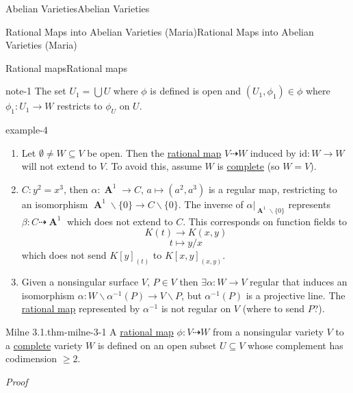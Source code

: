 \documentclass[10pt,]{book}
\makeatletter
\renewcommand*{\proofname}{Proof}
\renewenvironment{proof}[1][\proofname]{\par
  \pushQED{\qed}%
  \normalfont \topsep6\p@\@plus6\p@\relax
  \trivlist
  \item\relax
    {\itshape
    #1\@addpunct{.}}\hspace\labelsep\ignorespaces
}{%
  \popQED\endtrivlist\@endpefalse
}
\numberwithin{equation}{section}
\newcommand{\id}{\mathrm{id}}
\DeclareMathOperator{\aff}{\mathbf{A}}
\makeatother
\begin{document}
\begin{chapterptx}{Abelian Varieties}{}{Abelian Varieties}{}{}
\begin{sectionptx}{Rational Maps into Abelian Varieties (Maria)}{}{Rational Maps into Abelian Varieties (Maria)}{}{}
\begin{subsectionptx}{Rational maps}{}{Rational maps}{}{}
\begin{note}{}{note-1}%
\hypertarget{p-85}{}%
The set \(U_1 = \bigcup U\) where  \(\phi\) is defined is open and \((U_1,\phi_1) \in \phi\) where \(\phi_1 \colon U_1 \to W\) restricts to \(\phi_U\) on \(U\).%
\end{note}
\begin{example}{}{example-4}%
\hypertarget{p-86}{}%
\leavevmode%
\begin{enumerate}
\item\hypertarget{li-18}{}Let \(\emptyset \ne W \subseteq V\) be open. Then the \hyperref[def-rational-map]{rational map} \(V\dashrightarrow W\) induced by \(\id \colon W \to W\) will not extend to \(V\). To avoid this, assume \(W \) is \hyperref[def-abelian-complete-var]{complete} (so \(W = V\)).%
\item\hypertarget{li-19}{}\(C \colon y^2 = x^3\), then \(\alpha\colon \aff^1 \to C\), \(a\mapsto (a^2,a^3)\) is a regular map, restricting to an isomorphism  \(\aff^1 \smallsetminus \{0 \} \to C \smallsetminus \{0\}\). The inverse of \(\alpha|_{\aff^1\smallsetminus \{0\}}\) represents \(\beta \colon C \dashrightarrow \aff^1\) which does not extend to \(C\). This corresponds on function fields to%
\begin{equation*}
K(t) \to K(x,y)
\end{equation*}
%
\begin{equation*}
t\mapsto y/x
\end{equation*}
which does not send \(K[y]_{(t)}\) to \(K[x,y]_{(x,y)}\).%
\item\hypertarget{li-20}{}Given a nonsingular surface \(V,\, P\in V\) then \(\exists \alpha\colon W \to V\) regular that induces an isomorphism \(\alpha\colon W\smallsetminus \alpha^{-1} (P) \to V\smallsetminus P\), but \(\alpha^{-1}(P)\) is a projective line. The \hyperref[def-rational-map]{rational map} represented by \(\alpha^{-1}\) is not regular on \(V\) (where to send \(P\)?).%
\end{enumerate}
%
\end{example}
\begin{theorem}{Milne 3.1.}{}{thm-milne-3-1}%
\hypertarget{p-87}{}%
A \hyperref[def-rational-map]{rational map} \(\phi\colon V\dashrightarrow W\) from a nonsingular variety \(V\) to a \hyperref[def-abelian-complete-var]{complete} variety \(W\) is defined on an open subset  \(U \subseteq V\) whose complement has codimension \(\ge 2\).%
\end{theorem}
\begin{proof}\hypertarget{proof-12}{}

\end{proof}
\end{subsectionptx}
\end{sectionptx}
\end{chapterptx}
\end{document}
